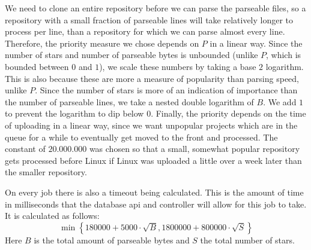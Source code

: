 \documentclass[../Main.tex]{subfiles}
\begin{document}
We need to clone an entire repository before we can parse the parseable files, so a repository with a small fraction of parseable lines will take relatively longer to process per line, than a repository for which we can parse almost every line. Therefore, the priority measure we chose depends on $P$ in a linear way. Since the number of stars and number of parseable bytes is unbounded (unlike $P$, which is bounded between $0$ and $1$), we scale these numbers by taking a base $2$ logarithm. This is also because these are more a measure of popularity than parsing speed, unlike $P$. Since the number of stars is more of an indication of importance than the number of parseable lines, we take a nested double logarithm of $B$. We add $1$ to prevent the logarithm to dip below $0$. Finally, the priority depends on the time of uploading in a linear way, since we want unpopular projects which are in the queue for a while to eventually get moved to the front and processed. The constant of $20.000.000$ was chosen so that a small, somewhat popular repository gets processed before Linux if Linux was uploaded a little over a week later than the smaller repository.

On every job there is also a timeout being calculated. This is the amount of time in milliseconds that the database api and controller will allow for this job to take. It is calculated as follows: $$\min \left\{180000 + 5000 \cdot \sqrt{B}, 1800000 + 800000 \cdot \sqrt{S} \right\}$$ Here $B$ is the total amount of parseable bytes and $S$ the total number of stars.
\end{document}
